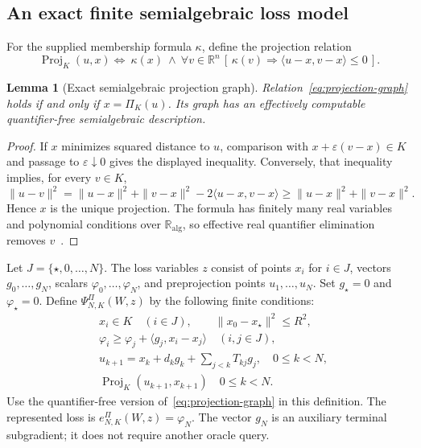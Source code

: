 \documentclass[11pt]{article}
\numberwithin{equation}{section}
\newtheorem{lemma}[theorem]{Lemma}
\theoremstyle{definition}
\newcommand{\R}{\mathbb R}
\newcommand{\K}{\mathbb R_{\mathrm{alg}}}
\begin{document}
\subsection{An exact finite semialgebraic loss model}
For the supplied membership formula $\kappa$, define the projection relation
\begin{equation}
 \operatorname{Proj}_K(u,x) \Longleftrightarrow\
 \kappa(x)\ \land\
 \forall v\in\R^n\,
 [\,\kappa(v)\Rightarrow\langle u-x,v-x\rangle\le0\,].
 \label{eq:projection-graph}
\end{equation}
\begin{lemma}[Exact semialgebraic projection graph]\label{lem:projection-graph}
Relation~\eqref{eq:projection-graph} holds if and only if $x=\Pi_K(u)$. Its graph has an effectively computable quantifier-free semialgebraic description.
\end{lemma}
\begin{proof}
If $x$ minimizes squared distance to $u$, comparison with $x+\varepsilon(v-x)\in K$ and passage to $\varepsilon\downarrow0$ gives the displayed inequality. Conversely, that inequality implies, for every $v\in K$,
\[
 \|u-v\|^2
 =\|u-x\|^2+\|v-x\|^2-2\langle u-x,v-x\rangle
 \ge\|u-x\|^2+\|v-x\|^2.
\]
Hence $x$ is the unique projection. The formula has finitely many real variables and polynomial conditions over $\K$, so effective real quantifier elimination removes $v$~\cite{BPR}.
\end{proof}

Let $J=\{\star,0,\ldots,N\}$. The loss variables $z$ consist of points $x_i$ for $i\in J$, vectors $g_0,\ldots,g_N$, scalars $\varphi_0,\ldots,\varphi_N$, and preprojection points $u_1,\ldots,u_N$. Set $g_\star=0$ and $\varphi_\star=0$. Define $\Psi_{N,K}^\Pi(W,z)$ by the following finite conditions:
\begin{align}
 &x_i\in K\quad(i\in J),\qquad
   \|x_0-x_\star\|^2\le R^2,\label{eq:projected-loss-model}\\
 &\varphi_i\ge\varphi_j+\langle g_j,x_i-x_j\rangle
                      \quad(i,j\in J),\nonumber\\
 &u_{k+1}=x_k+d_kg_k+\sum_{j<k}T_{kj}g_j,
                         \quad 0\le k<N,\nonumber\\
 &\operatorname{Proj}_K(u_{k+1},x_{k+1})
                         \quad 0\le k<N.\nonumber
\end{align}
Use the quantifier-free version of~\eqref{eq:projection-graph} in this definition. The represented loss is $e_{N,K}^\Pi(W,z)=\varphi_N$. The vector $g_N$ is an auxiliary terminal subgradient; it does not require another oracle query.
\end{document}
